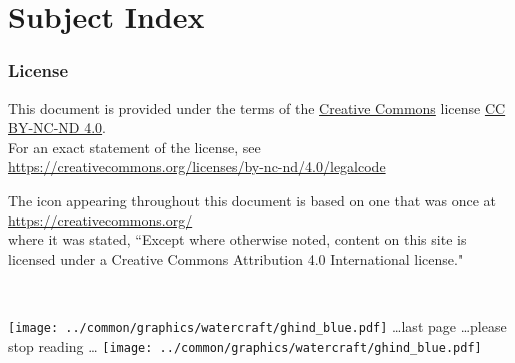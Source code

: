 \chapter*{Subject Index}
%
\begin{multicols}{3}
  
\end{multicols}

\subsection*{License}
This document is provided under the terms of 
the \href{https://creativecommons.org/}{Creative Commons} license \href{https://creativecommons.org/licenses/}{CC BY-NC-ND 4.0}.
\\For an exact statement of the license, see 
\\\indentx\url{https://creativecommons.org/licenses/by-nc-nd/4.0/legalcode}

The icon 
appearing throughout this document is based on one that was once at 
\\\indentx\url{https://creativecommons.org/}\\
where it was stated, 
``Except where otherwise noted, content on this site is licensed under a Creative Commons Attribution 4.0 International license."

\cleartoevenpage
\mbox{}\\\vfill
{}%
\begin{center}
\texttt{[image: ../common/graphics/watercraft/ghind\_blue.pdf]}%
{\sffamily\ldots last page \ldots please stop reading \ldots} 
\texttt{[image: ../common/graphics/watercraft/ghind\_blue.pdf]}%
\label{doc:end}
\end{center}













